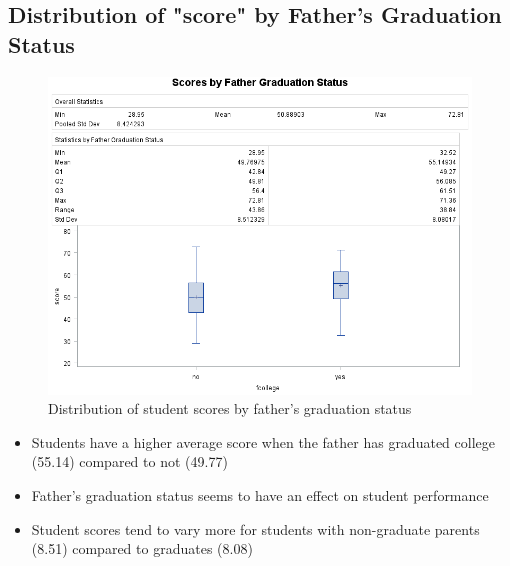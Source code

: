 \documentclass[12pt]{article}
\begin{document}
\subsection{Distribution of "score" by Father's Graduation Status}
\begin{figure}[h]
    \centering
    \includegraphics[width=1.14\textwidth]{images/scores_by_fcollege.png}
    \caption{Distribution of student scores by father's graduation status}
    \label{fig:scores_by_fcollege}
\end{figure}

\begin{itemize}
    \item Students have a higher average score when the father has graduated college (55.14) compared to not (49.77)
    \item Father's graduation status seems to have an effect on student performance
    \item Student scores tend to vary more for students with non-graduate parents (8.51) compared to graduates (8.08)
\end{itemize}
\newpage
\end{document}
